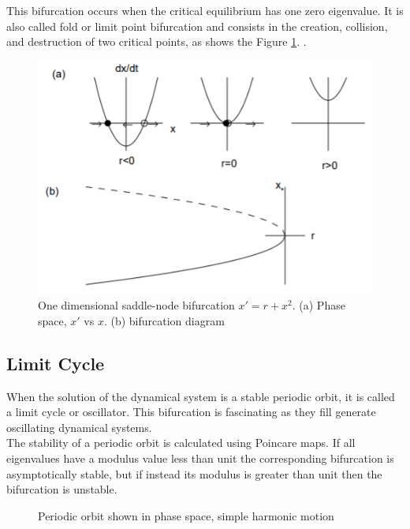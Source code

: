 This bifurcation occurs when the critical equilibrium has one zero eigenvalue. It is also called fold or limit point bifurcation and consists in the creation, collision, and destruction of two critical points, as shows the Figure \ref{fig:saddle-node}.
.
\begin{figure}[H]
    \centering
    \includegraphics[scale=0.75]{Images/saddle-node.png}
    \caption{One dimensional saddle-node bifurcation $x'=r+x^2$. (a) Phase space, $x'$ vs $x$. (b) bifurcation diagram }
    \label{fig:saddle-node}
\end{figure}

\subsection{Limit Cycle}



\begin{minipage}{0.45\linewidth}
When the solution of the dynamical system is a stable periodic orbit, it is called a limit cycle or oscillator. This bifurcation is fascinating as they fill generate oscillating dynamical systems. \\

The stability of a periodic orbit is calculated using Poincare maps. If all eigenvalues have a modulus value less than unit the corresponding bifurcation is asymptotically stable, but if instead its modulus is greater than unit then the bifurcation is unstable.

\end{minipage}\hfill
\begin{minipage}{0.45\linewidth}
\begin{figure}[H]
    \centering
    \caption{Periodic orbit shown in phase space, simple harmonic motion}
    \label{fig:air_motion}
\end{figure}
\end{minipage}



